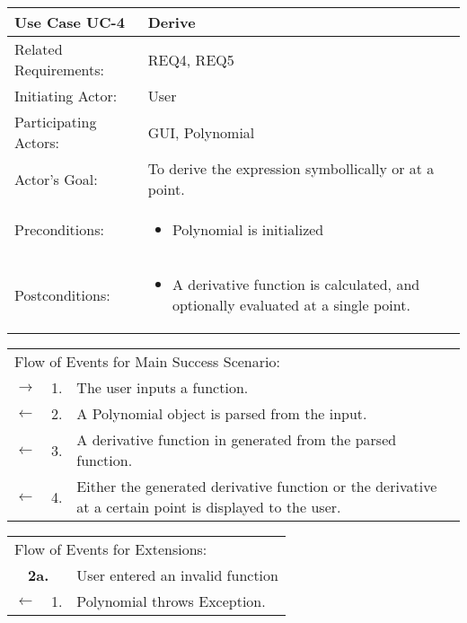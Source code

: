 \documentclass[11pt]{article}
\begin{document}
\newpage

\begin{center}
\begin{tabular}{p{1.5in}p{5in}}
\hline
\textbf{Use Case UC-4}     & \textbf{Derive} \\ \hline
Related Requirements: & REQ4, REQ5 \\
Initiating Actor:     & User \\
Participating Actors: & GUI, Polynomial \\
Actor's Goal:          & To derive the expression symbollically or at a point. \\
Preconditions:         & \begin{itemize}[nosep]
		      \item  Polynomial is initialized
                         \end{itemize} \\
Postconditions:        & \begin{itemize}[nosep]
                         \item A derivative function is calculated, and optionally evaluated at a single point.
                         \end{itemize} \\ \hline
\end{tabular}

\begin{tabular}{p{.25in}p{.25in}p{5.8in}}
\multicolumn{3}{l}{Flow of Events for Main Success Scenario:} \\
$\rightarrow$ & 1. & The user inputs a function.\\
$\leftarrow$   & 2. & A Polynomial object is parsed from the input.\\
$\leftarrow$   & 3. & A derivative function in generated from the parsed function.\\
$\leftarrow$   & 4. & Either the generated derivative function or the derivative at a certain point is displayed to the user.\\ 
\end{tabular}

\begin{tabular}{p{.25in}p{.25in}p{5.8in}}
\multicolumn{3}{l}{Flow of Events for Extensions:} \\
\multicolumn{2}{c}{\textbf{2a.}} & User entered an invalid function \\
$\leftarrow$  & 1.           & Polynomial throws Exception.\\
\end{tabular}
\end{center}
\end{document}
